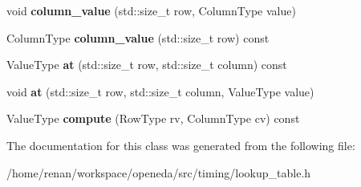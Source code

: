 \begin{DoxyCompactItemize}
\item 
\hypertarget{classophidian_1_1timing_1_1lookup__table_ae97a1c67d4c88760f0b4342040143076}{void {\bfseries column\-\_\-value} (std\-::size\-\_\-t row, Column\-Type value)}\label{classophidian_1_1timing_1_1lookup__table_ae97a1c67d4c88760f0b4342040143076}

\item 
\hypertarget{classophidian_1_1timing_1_1lookup__table_a67573edd96b8bdc0bd7f5aaec6d496b7}{Column\-Type {\bfseries column\-\_\-value} (std\-::size\-\_\-t row) const }\label{classophidian_1_1timing_1_1lookup__table_a67573edd96b8bdc0bd7f5aaec6d496b7}

\item 
\hypertarget{classophidian_1_1timing_1_1lookup__table_a00b9f5e7fd5cc8cb1cfadd495cd6cfa4}{Value\-Type {\bfseries at} (std\-::size\-\_\-t row, std\-::size\-\_\-t column) const }\label{classophidian_1_1timing_1_1lookup__table_a00b9f5e7fd5cc8cb1cfadd495cd6cfa4}

\item 
\hypertarget{classophidian_1_1timing_1_1lookup__table_a32188376b09f4ef9358161721191a4df}{void {\bfseries at} (std\-::size\-\_\-t row, std\-::size\-\_\-t column, Value\-Type value)}\label{classophidian_1_1timing_1_1lookup__table_a32188376b09f4ef9358161721191a4df}

\item 
\hypertarget{classophidian_1_1timing_1_1lookup__table_a954718be972a9b8abae3eeb7e39ee18c}{Value\-Type {\bfseries compute} (Row\-Type rv, Column\-Type cv) const }\label{classophidian_1_1timing_1_1lookup__table_a954718be972a9b8abae3eeb7e39ee18c}

\end{DoxyCompactItemize}


The documentation for this class was generated from the following file\-:\begin{DoxyCompactItemize}
\item 
/home/renan/workspace/openeda/src/timing/lookup\-\_\-table.\-h\end{DoxyCompactItemize}
